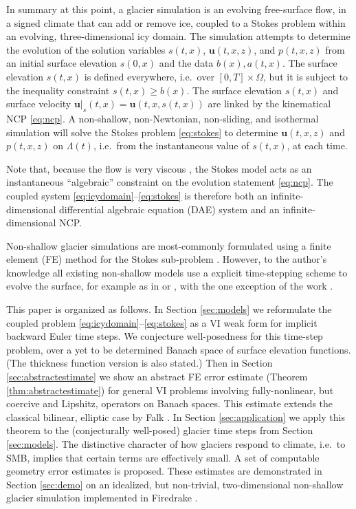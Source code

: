 \documentclass[hidelinks,onefignum,onetabnum,final]{siamart220329}  %
\newcommand{\bu}{\mathbf{u}}
\begin{document}
In summary at this point, a glacier simulation is an evolving free-surface flow, in a signed climate that can add or remove ice, coupled to a Stokes problem within an evolving, three-dimensional icy domain.  The simulation attempts to determine the evolution of the solution variables $s(t,x)$, $\bu(t,x,z)$, and $p(t,x,z)$ from an initial surface elevation $s(0,x)$ and the data $b(x),a(t,x)$.  The surface elevation $s(t,x)$ is defined everywhere, i.e.~over $[0,T]\times \Omega$, but it is subject to the inequality constraint $s(t,x) \ge b(x)$.  The surface elevation $s(t,x)$ and surface velocity $\bu|_s(t,x)=\bu(t,x,s(t,x))$ are linked by the kinematical NCP \eqref{eq:ncp}.  A non-shallow, non-Newtonian, non-sliding, and isothermal simulation will solve the Stokes problem \eqref{eq:stokes} to determine $\bu(t,x,z)$ and $p(t,x,z)$ on $\Lambda(t)$, i.e.~from the instantaneous value of $s(t,x)$, at each time.

Note that, because the flow is very viscous \cite{Acheson1990}, the Stokes model acts as an instantaneous ``algebraic'' constraint on the evolution statement \eqref{eq:ncp}.  The coupled system \eqref{eq:icydomain}--\eqref{eq:stokes} is therefore both an infinite-dimensional differential algebraic equation (DAE) system \cite{AscherPetzold1998} and an infinite-dimensional NCP.

Non-shallow glacier simulations are most-commonly formulated using a finite element (FE) method for the Stokes sub-problem \cite[for example]{IsaacStadlerGhattas2015,Jouvetetal2008,Pattynetal2008}.  However, to the author's knowledge all existing non-shallow models use a explicit time-stepping scheme to evolve the surface, for example as in \cite{Jouvetetal2008} or \cite{LofgrenAhlkronaHelanow2022}, with the one exception of the work \cite{WirbelJarosch2020}.

This paper is organized as follows.  In Section \ref{sec:models} we reformulate the coupled problem \eqref{eq:icydomain}--\eqref{eq:stokes} as a VI weak form for implicit backward Euler time steps.  We conjecture well-posedness for this time-step problem, over a yet to be determined Banach space of surface elevation functions.  (The thickness function version is also stated.)  Then in Section \ref{sec:abstractestimate} we show an abstract FE error estimate (Theorem \ref{thm:abstractestimate}) for general VI problems involving fully-nonlinear, but coercive and Lipshitz, operators on Banach spaces.  This estimate extends the classical bilinear, elliptic case by Falk \cite{Falk1974}.  In Section \ref{sec:application} we apply this theorem to the (conjecturally well-posed) glacier time steps from Section \ref{sec:models}.  The distinctive character of how glaciers respond to climate, i.e.~to SMB, implies that certain terms are effectively small.  A set of computable geometry error estimates is proposed.  These estimates are demonstrated in Section \ref{sec:demo} on an idealized, but non-trivial, two-dimensional non-shallow glacier simulation implemented in Firedrake \cite{Hametal2023}.
\end{document}
